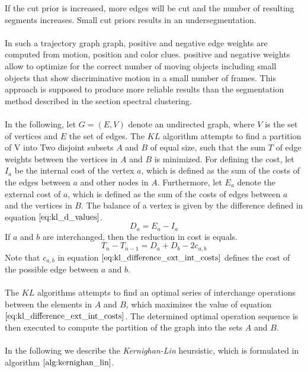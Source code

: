 If the cut prior is increased, more edges will be cut and the number of resulting segments increases. Small cut priors results in an undersegmentation. \\ \\
In such a trajectory graph graph, positive and negative edge weights are computed from motion, position and color clues. positive and negative weights allow to optimize for the correct number of moving objects including small objects that show discriminative motion in a small number of frames. This approach is supposed to produce more reliable results than the segmentation method described in the section spectral clustering. \\ \\
In the following, let $G = (E, V)$ denote an undirected graph, where $V$ is the set of vertices and $E$ the set of edges. 
The $KL$ algorithm attempts to find a partition of V into Two disjoint subsets $A$ and $B$ of equal size, such that the sum $T$ of edge weights between the vertices in $A$ and $B$ is minimized. For defining the cost, let $I_a$ be the internal cost of the vertex $a$, which is defined as the sum of the costs of the edges between $a$ and other nodes in $A$. Furthermore, let $E_a$ denote the external cost of $a$, which is defined as the sum of the costs of edges between $a$ and the vertices in $B$. The balance of a vertex is given by the difference defined in equation $\ref{eq:kl_d_values}$.
\begin{equation}
	D_a = E_a - I_a
\label{eq:kl_d_values}
\end{equation}
If $a$ and $b$ are interchanged, then the reduction in cost is equals.
\begin{equation}
	T_{n} - T_{n-1} = D_a + D_b - 2c_{a,b}
\label{eq:kl_difference_ext_int_costs}
\end{equation}
Note that $c_{a,b}$ in equation $\ref{eq:kl_difference_ext_int_costs}$ defines the cost of the possible edge between $a$ and $b$. \\ \\
The $KL$ algorithms attempts to find an optimal series of interchange operations between the elements in $A$ and $B$, which maximizes the value of equation $\ref{eq:kl_difference_ext_int_costs}$. The determined optimal operation sequence is then executed to compute the partition of the graph into the sets $A$ and $B$. \\ \\
In the following we describe the \emph{Kernighan-Lin} heursistic, which is formulated in algorithm $\ref{alg:kernighan_lin}$. 
